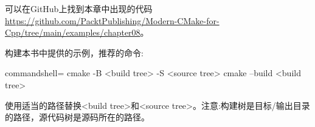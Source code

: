 可以在GitHub上找到本章中出现的代码 \url{https://github.com/PacktPublishing/Modern-CMake-for-Cpp/tree/main/examples/chapter08}。

构建本书中提供的示例，推荐的命令:

\begin{tcblisting}{commandshell={}}
cmake -B <build tree> -S <source tree>
cmake --build <build tree>
\end{tcblisting}

使用适当的路径替换<build tree>和<source tree>。注意:构建树是目标/输出目录的路径，源代码树是源码所在的路径。